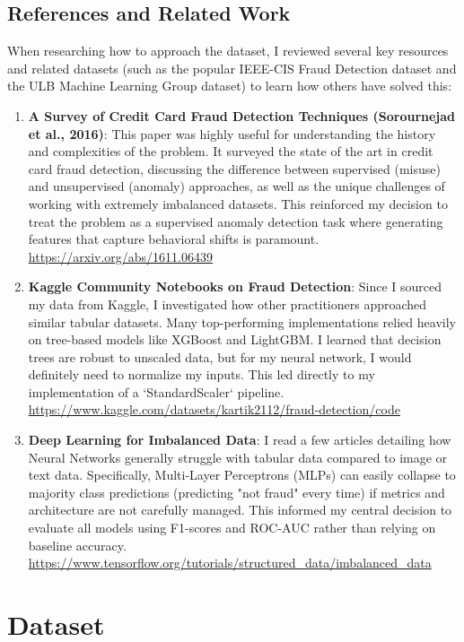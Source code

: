\documentclass[11pt]{article}
\begin{document}
\subsection{References and Related Work}
When researching how to approach the dataset, I reviewed several key resources and related datasets (such as the popular IEEE-CIS Fraud Detection dataset and the ULB Machine Learning Group dataset) to learn how others have solved this:
\begin{enumerate}
    \item \textbf{A Survey of Credit Card Fraud Detection Techniques (Sorournejad et al., 2016)}: This paper was highly useful for understanding the history and complexities of the problem. It surveyed the state of the art in credit card fraud detection, discussing the difference between supervised (misuse) and unsupervised (anomaly) approaches, as well as the unique challenges of working with extremely imbalanced datasets. This reinforced my decision to treat the problem as a supervised anomaly detection task where generating features that capture behavioral shifts is paramount. \url{https://arxiv.org/abs/1611.06439}
    \item \textbf{Kaggle Community Notebooks on Fraud Detection}: Since I sourced my data from Kaggle, I investigated how other practitioners approached similar tabular datasets. Many top-performing implementations relied heavily on tree-based models like XGBoost and LightGBM. I learned that decision trees are robust to unscaled data, but for my neural network, I would definitely need to normalize my inputs. This led directly to my implementation of a `StandardScaler` pipeline. \url{https://www.kaggle.com/datasets/kartik2112/fraud-detection/code}
    \item \textbf{Deep Learning for Imbalanced Data}: I read a few articles detailing how Neural Networks generally struggle with tabular data compared to image or text data. Specifically, Multi-Layer Perceptrons (MLPs) can easily collapse to majority class predictions (predicting "not fraud" every time) if metrics and architecture are not carefully managed. This informed my central decision to evaluate all models using F1-scores and ROC-AUC rather than relying on baseline accuracy. \url{https://www.tensorflow.org/tutorials/structured_data/imbalanced_data}
\end{enumerate}

\section{Dataset}
\end{document}
